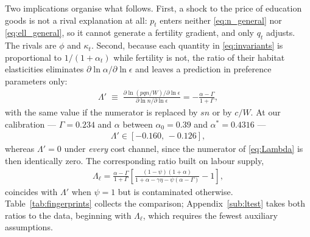 \documentclass[11pt]{article}
\begin{document}
Two implications organise what follows. First, a shock to the price of education goods is not a
rival explanation at all: $p_t$ enters neither \eqref{eq:n_general} nor \eqref{eq:ell_general}, so
it cannot generate a fertility gradient, and only $q_t$ adjusts. The rivals are $\phi$ and
$\kappa_t$. Second, because each quantity in \eqref{eq:invariants} is proportional to
$1/(1+\alpha_t)$ while fertility is not, the ratio of their habitat elasticities eliminates
$\partial\ln\alpha/\partial\ln\epsilon$ and leaves a prediction in preference parameters only:
\begin{align}
\Lambda'\;\equiv\;
\frac{\partial\ln\left(pqn/W\right)/\partial\ln\epsilon}{\partial\ln n/\partial\ln\epsilon}
=-\frac{\alpha-\Gamma}{1+\Gamma},
\label{eq:Lambda}
\end{align}
with the same value if the numerator is replaced by $sn$ or by $c/W$. At our calibration ---
$\Gamma=0.234$ and $\alpha$ between $\alpha_0=0.39$ and $\alpha^\ast=0.4316$ ---
\begin{align}
\Lambda'\in[-0.160,\,-0.126],
\label{eq:Lambda_number}
\end{align}
whereas $\Lambda'=0$ under \emph{every} cost channel, since the numerator of \eqref{eq:Lambda} is
then identically zero. The corresponding ratio built on labour supply,
\begin{align}
\Lambda_\ell=\frac{\alpha-\Gamma}{1+\Gamma}
\left[\frac{(1-\psi)(1+\alpha)}{1+\alpha-\gamma\eta-\psi(\alpha-\Gamma)}-1\right],
\label{eq:Lambda_ell}
\end{align}
coincides with $\Lambda'$ when $\psi=1$ but is contaminated otherwise. Table~\ref{tab:fingerprints}
collects the comparison; Appendix~\ref{sub:ltest} takes both ratios to the data, beginning with
$\Lambda_\ell$, which requires the fewest auxiliary assumptions.
\end{document}
